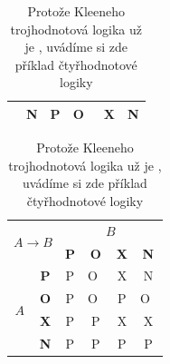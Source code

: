 \documentclass[a4paper, 11pt]{article}
\begin{document}
\begin{table}[h]
\begin{tabular}{|c|c|c|c|c|c|}
		                                                 & \textbf{N}               & P          & O~         & X          & N  \\   \hline
	\end{tabular}
	\begin{tabular}{|c|c|c|c|c|c|}  \hline
		\multicolumn{2}{|l|}{\multirow{2}{*}{$A\rightarrow B$}} & \multicolumn{4}{c|}{$B$}                                             \\ \cline{3-6}
		\multicolumn{2}{|l|}{}                                  & \textbf{P}               & \textbf{O} & \textbf{X} & \textbf{N}      \\  \hline
		\multirow{4}{*}{$A$}                                    & \textbf{P}               & P          & O~         & X          & N  \\  \cline{2-6}
		                                                        & \textbf{O}               & P          & O~         & P          & O~ \\  \cline{2-6}
		                                                        & \textbf{X}               & P          & P          & X          & X  \\  \cline{2-6}
		                                                        & \textbf{N}               & P          & P          & P          & P  \\   \hline
	\end{tabular}
	\caption{Protože Kleeneho trojhodnotová logika už je , uvádíme si zde příklad čtyřhodnotové logiky}
	\label{tab:čtyřhodinová logika}
\end{table}
\pagebreak
\end{document}

